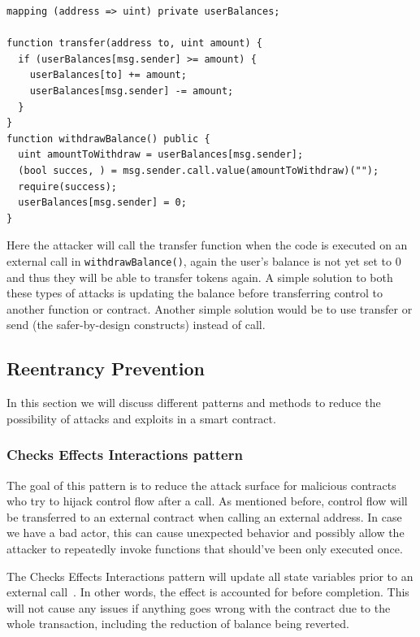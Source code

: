 \documentclass[10pt,conference]{IEEEtran}
\begin{document}
\begin{lstlisting}[language=Solidity, caption=Cross-function reentrancy attack, label=lst:reentrancy2]
mapping (address => uint) private userBalances;

function transfer(address to, uint amount) {
  if (userBalances[msg.sender] >= amount) {
    userBalances[to] += amount;
    userBalances[msg.sender] -= amount;
  }
}
function withdrawBalance() public {
  uint amountToWithdraw = userBalances[msg.sender];
  (bool succes, ) = msg.sender.call.value(amountToWithdraw)("");
  require(success);
  userBalances[msg.sender] = 0;
}

\end{lstlisting}

Here the attacker will call the transfer function when the code is executed on an external call in \texttt{withdrawBalance()},  again the user's balance is not yet set to 0 and thus they will be able to transfer tokens again. A simple solution to both these types of attacks is updating the balance before transferring control to another function or contract.  Another simple solution would be to use transfer or send (the safer-by-design constructs) instead of call.

\subsection{Reentrancy Prevention}
In this section we will discuss different patterns and methods to reduce the possibility of attacks and exploits in a smart contract. 

\subsubsection{Checks Effects Interactions pattern}

The goal of this pattern is to reduce the attack surface for malicious contracts who try to hijack control flow after a call.  As mentioned before, control flow will be transferred to an external contract when calling an external address. In case we have a bad actor, this can cause unexpected behavior and possibly allow the attacker to repeatedly invoke functions that should've been only executed once. 

The Checks Effects Interactions pattern will update all state variables prior to an external call~\cite{cei}. In other words, the effect is accounted for before completion. This will not cause any issues if anything goes wrong with the contract due to the whole transaction, including the reduction of balance being reverted. 
\end{document}
